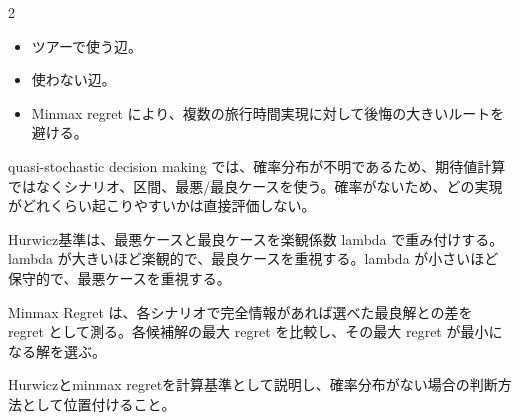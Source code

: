\clearpage



\vspace{1.5mm}

\begin{multicols}{2}

\footnotesize

\raggedcolumns


\begin{itemize}
\item ツアーで使う辺。
\item 使わない辺。
\item Minmax regret により、複数の旅行時間実現に対して後悔の大きいルートを避ける。
\end{itemize}

quasi-stochastic decision making では、確率分布が不明であるため、期待値計算ではなくシナリオ、区間、最悪/最良ケースを使う。確率がないため、どの実現がどれくらい起こりやすいかは直接評価しない。\par

Hurwicz基準は、最悪ケースと最良ケースを楽観係数 lambda で重み付けする。lambda が大きいほど楽観的で、最良ケースを重視する。lambda が小さいほど保守的で、最悪ケースを重視する。\par

Minmax Regret は、各シナリオで完全情報があれば選べた最良解との差を regret として測る。各候補解の最大 regret を比較し、その最大 regret が最小になる解を選ぶ。\par

Hurwiczとminmax regretを計算基準として説明し、確率分布がない場合の判断方法として位置付けること。\par


\end{multicols}
